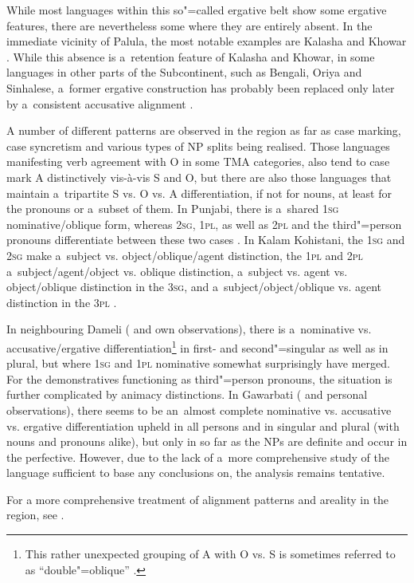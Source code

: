 While most languages within this so"=called ergative belt show some ergative features, there are nevertheless some where they are entirely absent. In the immediate vicinity of Palula, the most notable examples are Kalasha and Khowar \citep[41]{bashir1988}. While this absence is a~retention feature of Kalasha and Khowar, in some languages in other parts of the Subcontinent, such as Bengali, Oriya and Sinhalese, a~former ergative construction has probably been replaced only later by a~consistent accusative alignment \citep[343--344]{masica1991}.



A number of different patterns are observed in the region as far as case marking, case syncretism and various types of NP splits being realised. Those languages manifesting verb agreement with O in some TMA categories, also tend to case mark A distinctively vis-à-vis S and O, but there are also those languages that maintain a~tripartite S vs. O vs. A differentiation, if not for nouns, at least for the pronouns or a~subset of them. In Punjabi, there is a~shared \textsc{1sg} nominative/oblique form, whereas \textsc{2sg}, \textsc{1pl}, as well as \textsc{2pl} and the third"=person pronouns differentiate between these two cases \citep[229]{bhatia1993}. In Kalam Kohistani, the \textsc{1sg} and \textsc{2sg} make a~subject vs. object/oblique/agent distinction, the \textsc{1pl} and \textsc{2pl} a~subject/agent/object vs. oblique distinction, a~subject vs. agent vs. object/oblique distinction in the \textsc{3sg}, and a~subject/object/oblique vs. agent distinction in the \textsc{3pl} \citep[39]{baart1999a}. 



In neighbouring Dameli (\citealt{morgenstierne1942} and own observations), there is a~nominative vs. accusative/ergative differentiation\footnote{This rather unexpected grouping of A with O vs. S is sometimes referred to as ``double"=oblique'' \citep{payne1980}.} in first- and second"=singular as well as in plural, but where \textsc{1sg} and \textsc{1pl} nominative somewhat surprisingly have merged. For the demonstratives functioning as third"=person pronouns, the situation is further complicated by animacy distinctions. In Gawarbati (\citealt{morgenstierne1950} and personal observations), there seems to be an~almost complete nominative vs. accusative vs. ergative differentiation upheld in all persons and in singular and plural (with nouns and pronouns alike), but only in so far as the NPs are definite and occur in the perfective. However, due to the lack of a~more comprehensive study of the language sufficient to base any conclusions on, the analysis remains tentative. 
 

For a more comprehensive treatment of alignment patterns and areality in the region, see \citet{liljegren2014}. 